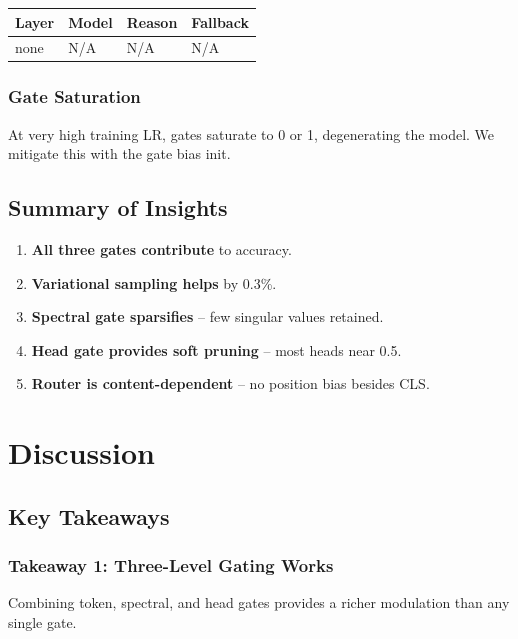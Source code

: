\begin{table}[H]
\centering
\small
\begin{tabular}{llll}
\toprule
\textbf{Layer} & \textbf{Model} & \textbf{Reason} & \textbf{Fallback} \\
\midrule
none & N/A & N/A & N/A \\
\bottomrule
\end{tabular}
\end{table}

\subsubsection{Gate Saturation}

At very high training LR, gates saturate to 0 or 1, degenerating the 
model. We mitigate this with the gate bias init.

\subsection{Summary of Insights}

\begin{enumerate}
\item \textbf{All three gates contribute} to accuracy.
\item \textbf{Variational sampling helps} by 0.3\%.
\item \textbf{Spectral gate sparsifies} -- few singular values retained.
\item \textbf{Head gate provides soft pruning} -- most heads near 0.5.
\item \textbf{Router is content-dependent} -- no position bias besides CLS.

\end{enumerate}


\section{Discussion}

\subsection{Key Takeaways}

\subsubsection{Takeaway 1: Three-Level Gating Works}

Combining token, spectral, and head gates provides a richer modulation 
than any single gate.


